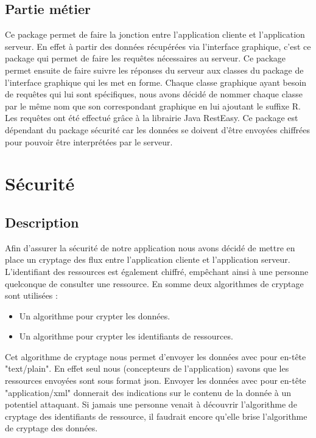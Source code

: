 \subsection{Partie métier}
Ce package permet de faire la jonction entre l'application cliente et l'application serveur. 
En effet à partir des données récupérées via l'interface graphique, c'est ce package qui permet de faire les requêtes nécessaires au serveur. Ce package permet ensuite de faire suivre les réponses du serveur aux classes du package de l'interface graphique qui les met en forme.
Chaque classe graphique ayant besoin de requêtes qui lui sont spécifiques, nous avons décidé de nommer chaque classe par le même nom que son correspondant graphique en lui ajoutant le suffixe R. \\
Les requêtes ont été effectué grâce à la librairie Java RestEasy.
Ce package est dépendant du package sécurité car les données se doivent d'être envoyées chiffrées pour pouvoir être interprétées par le serveur.\\


\newpage
\section{Sécurité}

\subsection{Description}
Afin d'assurer la sécurité de notre application nous avons décidé de mettre en place un cryptage des flux entre l'application cliente et l'application serveur.
L’identifiant des ressources est également chiffré, empêchant ainsi à une personne quelconque de consulter une ressource.
En somme deux algorithmes de cryptage sont utilisées : 
\begin{itemize}
\item Un algorithme pour crypter les données.
\item Un algorithme pour crypter les identifiants de ressources.
\end{itemize}
Cet algorithme de cryptage nous permet d'envoyer les données avec pour en-tête "text/plain". 
En effet seul nous (concepteurs de l'application) savons que les ressources envoyées sont sous format json. Envoyer les données avec pour en-tête "application/xml" donnerait des indications sur le contenu de la donnée à un potentiel attaquant.
Si jamais une personne venait à découvrir l'algorithme de cryptage des identifiants de ressource, il faudrait encore qu'elle brise l'algorithme de cryptage des données.

